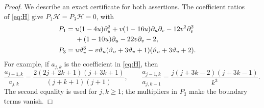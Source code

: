 \documentclass[11pt,a4paper]{article}
\theoremstyle{remark}
\newcommand{\tht}{\vartheta}
\newcommand{\HH}{\mathcal H}
\begin{document}
\begin{proof}
We describe an exact certificate for both assertions. The coefficient
ratios of \eqref{eq:H} give $P_1\HH=P_3\HH=0$, with
\begin{align}\label{eq:PDE}
P_1={}&u(1-4u)\partial_u^2+v(1-16u)\partial_u\partial_v
       -12v^2\partial_v^2\notag\\
 &+(1-10u)\partial_u-22v\partial_v-2,\notag\\
P_3={}&u\tht_v^3-v\tht_u(\tht_u+3\tht_v+1)
                              (\tht_u+3\tht_v+2).
\end{align}
For example, if $a_{j,k}$ is the coefficient in \eqref{eq:H}, then
\[
 \frac{a_{j+1,k}}{a_{j,k}}
 =\frac{2(2j+2k+1)(j+3k+1)}{(j+k+1)(j+1)},\qquad
 \frac{a_{j-1,k}}{a_{j,k-1}}
 =\frac{j(j+3k-2)(j+3k-1)}{k^3}.
\]
The second equality is used for $j,k\geq1$; the multipliers in $P_3$
make the boundary terms vanish.


\end{proof}
\end{document}
